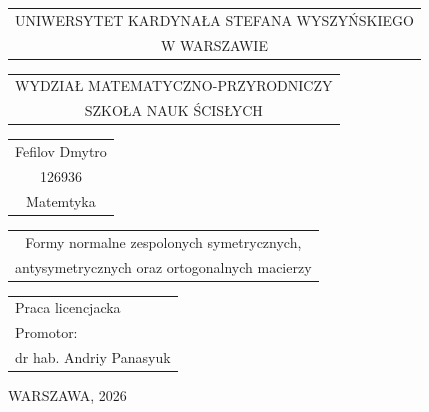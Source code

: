 \begin{titlepage}
\vspace{-0.5cm}

\renewcommand{\arraystretch}{1.3}

\begin{center}
{\footnotesize
\begin{tabular}{c}
UNIWERSYTET KARDYNAŁA STEFANA WYSZYŃSKIEGO\\
W WARSZAWIE\\
\end{tabular}
}
\vspace{2.5cm}

{\footnotesize
\begin{tabular}{c}
WYDZIAŁ MATEMATYCZNO-PRZYRODNICZY\\
SZKOŁA NAUK ŚCISŁYCH\\
\end{tabular}
}
\vspace{2.7cm}

\renewcommand{\arraystretch}{1.5}

{\normalsize
\begin{tabular}{c}
Fefilov Dmytro\\

126936\\

Matemtyka\\
\end{tabular}
}

\vspace{2.3cm}

{\small
\begin{tabular}{c}
Formy normalne zespolonych symetrycznych,\\
antysymetrycznych oraz ortogonalnych macierzy
\end{tabular}
}

\end{center}
\vspace{3cm}

\hspace{6cm}
\begin{tabular}{l}
Praca licencjacka\\

Promotor:\\

dr hab. Andriy Panasyuk
\end{tabular}

\vspace{3.5cm}

\begin{center}
{\small WARSZAWA, 2026}
\end{center}

\renewcommand{\arraystretch}{1}

\end{titlepage}